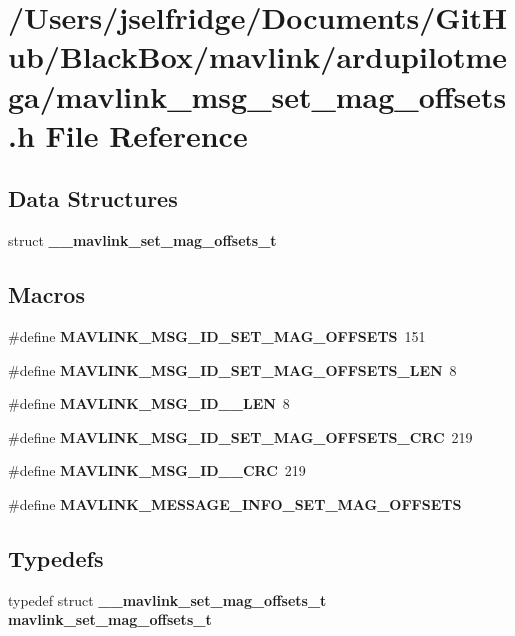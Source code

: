 \section{/\+Users/jselfridge/\+Documents/\+Git\+Hub/\+Black\+Box/mavlink/ardupilotmega/mavlink\+\_\+msg\+\_\+set\+\_\+mag\+\_\+offsets.h File Reference}
\label{mavlink__msg__set__mag__offsets_8h}
\subsection*{Data Structures}
\begin{DoxyCompactItemize}
\item 
struct \textbf{ \+\_\+\+\_\+mavlink\+\_\+set\+\_\+mag\+\_\+offsets\+\_\+t}
\end{DoxyCompactItemize}
\subsection*{Macros}
\begin{DoxyCompactItemize}
\item 
\#define \textbf{ M\+A\+V\+L\+I\+N\+K\+\_\+\+M\+S\+G\+\_\+\+I\+D\+\_\+\+S\+E\+T\+\_\+\+M\+A\+G\+\_\+\+O\+F\+F\+S\+E\+TS}~151
\item 
\#define \textbf{ M\+A\+V\+L\+I\+N\+K\+\_\+\+M\+S\+G\+\_\+\+I\+D\+\_\+\+S\+E\+T\+\_\+\+M\+A\+G\+\_\+\+O\+F\+F\+S\+E\+T\+S\+\_\+\+L\+EN}~8
\item 
\#define \textbf{ M\+A\+V\+L\+I\+N\+K\+\_\+\+M\+S\+G\+\_\+\+I\+D\+\_\+\_\+\+L\+EN}~8
\item 
\#define \textbf{ M\+A\+V\+L\+I\+N\+K\+\_\+\+M\+S\+G\+\_\+\+I\+D\+\_\+\+S\+E\+T\+\_\+\+M\+A\+G\+\_\+\+O\+F\+F\+S\+E\+T\+S\+\_\+\+C\+RC}~219
\item 
\#define \textbf{ M\+A\+V\+L\+I\+N\+K\+\_\+\+M\+S\+G\+\_\+\+I\+D\+\_\+\_\+\+C\+RC}~219
\item 
\#define \textbf{ M\+A\+V\+L\+I\+N\+K\+\_\+\+M\+E\+S\+S\+A\+G\+E\+\_\+\+I\+N\+F\+O\+\_\+\+S\+E\+T\+\_\+\+M\+A\+G\+\_\+\+O\+F\+F\+S\+E\+TS}
\end{DoxyCompactItemize}
\subsection*{Typedefs}
\begin{DoxyCompactItemize}
\item 
typedef struct \textbf{ \+\_\+\+\_\+mavlink\+\_\+set\+\_\+mag\+\_\+offsets\+\_\+t} \textbf{ mavlink\+\_\+set\+\_\+mag\+\_\+offsets\+\_\+t}
\end{DoxyCompactItemize}


